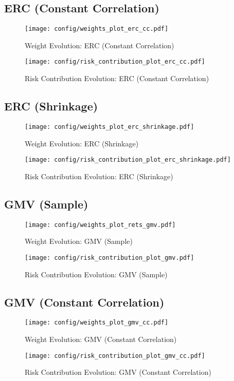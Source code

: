 \documentclass{article}
\begin{document}
\subsection{ERC (Constant Correlation)}
\begin{figure}[H]
    \centering
    \texttt{[image: config/weights\_plot\_erc\_cc.pdf]}
    \caption{Weight Evolution: ERC (Constant Correlation)}
    \label{fig:weights_erc_cc}
\end{figure}
\begin{figure}[H]
    \centering
    \texttt{[image: config/risk\_contribution\_plot\_erc\_cc.pdf]}
    \caption{Risk Contribution Evolution: ERC (Constant Correlation)}
    \label{fig:risk_contribution_erc_cc}
\end{figure}
\clearpage

\subsection{ERC (Shrinkage)}
\begin{figure}[H]
    \centering
    \texttt{[image: config/weights\_plot\_erc\_shrinkage.pdf]}
    \caption{Weight Evolution: ERC (Shrinkage)}
    \label{fig:weights_erc_shrinkage}
\end{figure}
\begin{figure}[H]
    \centering
    \texttt{[image: config/risk\_contribution\_plot\_erc\_shrinkage.pdf]}
    \caption{Risk Contribution Evolution: ERC (Shrinkage)}
    \label{fig:risk_contribution_erc_shrinkage}
\end{figure}
\clearpage

\subsection{GMV (Sample)}
\begin{figure}[H]
    \centering
    \texttt{[image: config/weights\_plot\_rets\_gmv.pdf]}
    \caption{Weight Evolution: GMV (Sample)}
    \label{fig:weights_gmv_sample}
\end{figure}
\begin{figure}[H]
    \centering
    \texttt{[image: config/risk\_contribution\_plot\_gmv.pdf]}
    \caption{Risk Contribution Evolution: GMV (Sample)}
    \label{fig:risk_contribution_gmv_sample}
\end{figure}
\clearpage

\subsection{GMV (Constant Correlation)}
\begin{figure}[H]
    \centering
    \texttt{[image: config/weights\_plot\_gmv\_cc.pdf]}
    \caption{Weight Evolution: GMV (Constant Correlation)}
    \label{fig:weights_gmv_cc}
\end{figure}
\begin{figure}[H]
    \centering
    \texttt{[image: config/risk\_contribution\_plot\_gmv\_cc.pdf]}
    \caption{Risk Contribution Evolution: GMV (Constant Correlation)}
    \label{fig:risk_contribution_gmv_cc}
\end{figure}
\clearpage
\end{document}
